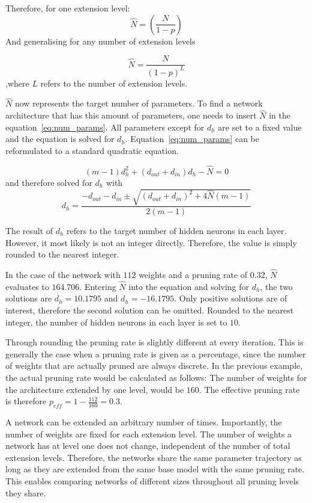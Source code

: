 Therefore, for one extension level:
\[
\hat N = {(\frac{N}{1-p})}
\]
And generalising for any number of extension levels

\[
\hat N = {\frac{N}{{(1-p)}^L}}
\]
,where $L$ refers to the number of extension levels.

$\hat N$ now represents the target number of parameters. 
To find a network architecture that has this amount of parameters, one needs to insert $\hat N$ in the equation~\ref{eq:num_params}.
All parameters except for $d_h$ are set to a fixed value and the equation is solved for $d_h$.
Equation~\ref{eq:num_params} can be reformulated to a standard quadratic equation.

\[
    (m-1)d_h^2 + (d_{out} + d_{in}) d_h - \hat N = 0
\]
and therefore solved for $d_h$ with 
\[
    d_h = \frac{
        - d_{out} - d_{in} \pm \sqrt{  {(d_{out} + d_{in})}^2 + 4 \hat N (m-1) } 
    }{
        2(m-1)
    }
\]

The result of $d_h$ refers to the target number of hidden neurons in each layer.
However, it most likely is not an integer directly.
Therefore, the value is simply rounded to the nearest integer.

In the case of the network with $112$ weights and a pruning rate of $0.32$, $\hat N$ evaluates to $164.706$.
Entering $\hat N$ into the equation and solving for $d_h$, the two solutions are $d_h=10.1795$ and $d_h=-16.1795$.
Only positive solutions are of interest, therefore the second solution can be omitted.
Rounded to the nearest integer, the number of hidden neurons in each layer is set to $10$.

Through rounding the pruning rate is slightly different at every iteration.
This is generally the case when a pruning rate is given as a percentage, since the number of weights that are actually pruned are always discrete.
In the previous example, the actual pruning rate would be calculated as follows:
The number of weights for the architecture extended by one level, would be $160$.
The effective pruning rate is therefore $p_{eff}=1-\frac{112}{160}=0.3$.

A network can be extended an arbitrary number of times.
Importantly, the number of weights are fixed for each extension level.
The number of weights a network has at level one does not change, independent of the number of total extension levels.
Therefore, the networks share the same parameter trajectory as long as they are extended from the same base model with the same pruning rate.
This enables comparing networks of different sizes throughout all pruning levels they share.

